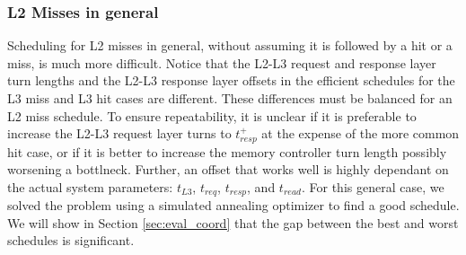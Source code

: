 \subsubsection{L2 Misses in general}
Scheduling for L2 misses in general, without assuming it is followed by a hit 
or a miss, is much more difficult. Notice that the L2-L3 request and response 
layer turn lengths and the L2-L3 response layer offsets in the efficient 
schedules for the L3 miss and L3 hit cases are different. These differences 
must be balanced for an L2 miss schedule. To ensure repeatability, it is 
unclear if it is preferable to increase the L2-L3 request layer turns to 
$t_{resp}^+$ at the expense of the more common hit case, or if it is better to 
increase the memory controller turn length possibly worsening a bottlneck.
Further, an offset that works well is highly dependant on the actual system 
parameters: $t_{L3}$, $t_{req}$, $t_{resp}$, and $t_{read}$.
For this general case, we solved the problem using a simulated annealing optimizer
to find a good schedule.
We will show in Section \ref{sec:eval_coord} that the gap between
the best and worst schedules is significant. 
